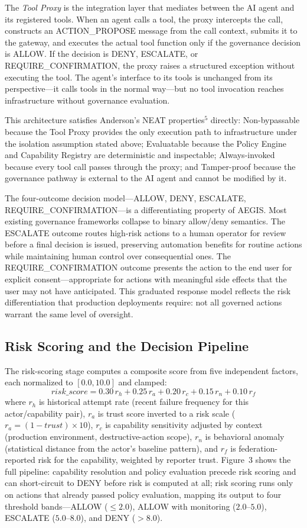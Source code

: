 \documentclass{IEEEcsmag}
\begin{document}
The {\it Tool Proxy} is the integration layer that mediates between the AI agent and its registered tools. When an agent calls a tool, the proxy intercepts the call, constructs an ACTION\_PROPOSE message from the call context, submits it to the gateway, and executes the actual tool function only if the governance decision is ALLOW. If the decision is DENY, ESCALATE, or REQUIRE\_CONFIRMATION, the proxy raises a structured exception without executing the tool. The agent's interface to its tools is unchanged from its perspective---it calls tools in the normal way---but no tool invocation reaches infrastructure without governance evaluation.

This architecture satisfies Anderson's NEAT properties$^{5}$ directly: Non-bypassable because the Tool Proxy provides the only execution path to infrastructure under the isolation assumption stated above; Evaluatable because the Policy Engine and Capability Registry are deterministic and inspectable; Always-invoked because every tool call passes through the proxy; and Tamper-proof because the governance pathway is external to the AI agent and cannot be modified by it.

The four-outcome decision model---ALLOW, DENY, ESCALATE, REQUIRE\_CONFIRMATION---is a differentiating property of AEGIS. Most existing governance frameworks collapse to binary allow/deny semantics. The ESCALATE outcome routes high-risk actions to a human operator for review before a final decision is issued, preserving automation benefits for routine actions while maintaining human control over consequential ones. The REQUIRE\_CONFIRMATION outcome presents the action to the end user for explicit consent---appropriate for actions with meaningful side effects that the user may not have anticipated. This graduated response model reflects the risk differentiation that production deployments require: not all governed actions warrant the same level of oversight.

\subsection{Risk Scoring and the Decision Pipeline}

The risk-scoring stage computes a composite score from five independent factors, each normalized to $[0.0, 10.0]$ and clamped:
\[risk\_score = 0.30\,r_h + 0.25\,r_a + 0.20\,r_c + 0.15\,r_n + 0.10\,r_f\]
where $r_h$ is historical attempt rate (recent failure frequency for this actor/capability pair), $r_a$ is trust score inverted to a risk scale ($r_a = (1 - trust) \times 10$), $r_c$ is capability sensitivity adjusted by context (production environment, destructive-action scope), $r_n$ is behavioral anomaly (statistical distance from the actor's baseline pattern), and $r_f$ is federation-reported risk for the capability, weighted by reporter trust. Figure~3 shows the full pipeline: capability resolution and policy evaluation precede risk scoring and can short-circuit to DENY before risk is computed at all; risk scoring runs only on actions that already passed policy evaluation, mapping its output to four threshold bands---ALLOW ($\le 2.0$), ALLOW with monitoring ($2.0$--$5.0$), ESCALATE ($5.0$--$8.0$), and DENY ($> 8.0$).
\end{document}
